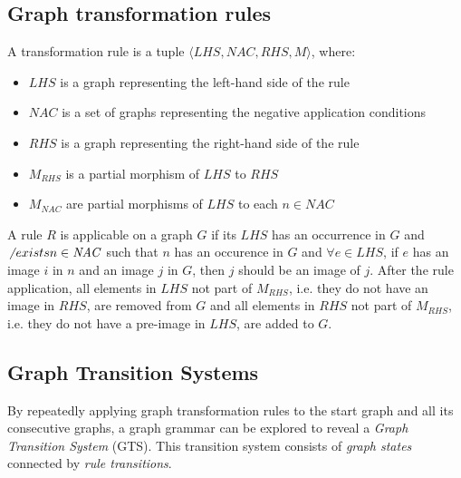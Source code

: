 \subsection{Graph transformation rules}
\begin{definition}
A transformation rule is a tuple $\langle \mathit{LHS}, \mathit{NAC}, \mathit{RHS}, \mathit{M}\rangle$, where:
\begin{itemize}
  \item $\mathit{LHS}$ is a graph representing the left-hand side of the rule
  \item $\mathit{NAC}$ is a set of graphs representing the negative application conditions
  \item $\mathit{RHS}$ is a graph representing the right-hand side of the rule
  \item $\mathit{M_{RHS}}$ is a partial morphism of $\mathit{LHS}$ to $\mathit{RHS}$ 
  \item $\mathit{M_{NAC}}$ are partial morphisms of $\mathit{LHS}$ to each $n \in \mathit{NAC}$
\end{itemize}
\end{definition}

A rule $R$ is applicable on a graph $G$ if its $\mathit{LHS}$ has an occurrence in $G$ and $\not\ exists n \in \mathit{NAC}$ such that $n$ has an occurence in $G$ and $\forall e \in \mathit{LHS}$, if $e$ has an image $i$ in $n$ and an image $j$ in $G$, then $j$ should be an image of $j$. After the rule application, all elements in $\mathit{LHS}$ not part of $\mathit{M_{RHS}}$, i.e. they do not have an image in $\mathit{RHS}$, are removed from $G$ and all elements in $\mathit{RHS}$ not part of $\mathit{M_{RHS}}$, i.e. they do not have a pre-image in $\mathit{LHS}$, are added to $G$.

\subsection{Graph Transition Systems}
By repeatedly applying graph transformation rules to the start graph and all its consecutive graphs, a graph grammar can be explored to reveal a \textit{Graph Transition System} (GTS). This transition system consists of \textit{graph states} connected by \textit{rule transitions}.

